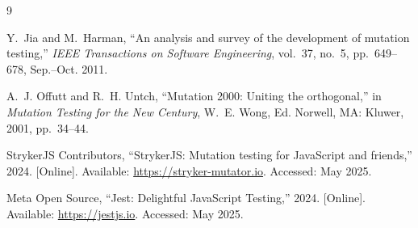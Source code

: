 \documentclass[conference]{IEEEtran}
\begin{document}
\begin{thebibliography}{9}

Y.~Jia and M.~Harman,
``An analysis and survey of the development of mutation testing,''
\textit{IEEE Transactions on Software Engineering},
vol.~37, no.~5, pp.~649--678, Sep.--Oct. 2011.

A.~J. Offutt and R.~H. Untch,
``Mutation 2000: Uniting the orthogonal,''
in \textit{Mutation Testing for the New Century},
W.~E. Wong, Ed. Norwell, MA: Kluwer, 2001, pp.~34--44.

StrykerJS Contributors,
``StrykerJS: Mutation testing for JavaScript and friends,''
2024. [Online]. Available: \url{https://stryker-mutator.io}.
Accessed: May 2025.

Meta Open Source,
``Jest: Delightful JavaScript Testing,''
2024. [Online]. Available: \url{https://jestjs.io}.
Accessed: May 2025.

\end{thebibliography}
\end{document}
